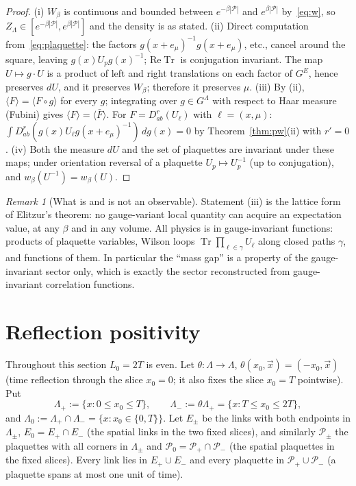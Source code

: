 \documentclass[11pt,a4paper]{article}
\theoremstyle{definition}
\theoremstyle{remark}
\newtheorem{remark}[theorem]{Remark}
\DeclareMathOperator{\Tr}{Tr}
\newcommand{\cP}{\mathcal{P}}
\begin{document}
\begin{proof}
(i) $W_\beta$ is continuous and bounded between $e^{-\beta|\cP|}$ and $e^{\beta|\cP|}$ by~\eqref{eq:w}, so
$Z_\Lambda\in[e^{-\beta|\cP|},e^{\beta|\cP|}]$ and the density is as stated.
(ii) Direct computation from~\eqref{eq:plaquette}: the factors $g(x+e_\mu)^{-1}g(x+e_\mu)$, etc., cancel
around the square, leaving $g(x)U_pg(x)^{-1}$; $\mathrm{Re}\Tr$ is conjugation invariant. The map $U\mapsto g\cdot U$
is a product of left and right translations on each factor of $G^{E}$, hence preserves $dU$, and it preserves
$W_\beta$; therefore it preserves $\mu$.
(iii) By (ii), $\langle F\rangle=\langle F\circ g\rangle$ for every $g$; integrating over $g\in G^\Lambda$ with
respect to Haar measure (Fubini) gives $\langle F\rangle=\langle\bar F\rangle$. For $F=D^r_{ab}(U_\ell)$ with
$\ell=(x,\mu)$: $\int D^r_{ab}(g(x)U_\ell g(x+e_\mu)^{-1})\,dg(x)=0$ by Theorem~\ref{thm:pw}(ii) with $r'=0$.
(iv) Both the measure $dU$ and the set of plaquettes are invariant under these maps; under orientation
reversal of a plaquette $U_p\mapsto U_p^{-1}$ (up to conjugation), and $w_\beta(U^{-1})=w_\beta(U)$.
\end{proof}

\begin{remark}[What is and is not an observable]
Statement (iii) is the lattice form of Elitzur's theorem: no gauge-variant local quantity can acquire an
expectation value, at any $\beta$ and in any volume. All physics is in gauge-invariant functions: products
of plaquette variables, Wilson loops $\Tr\prod_{\ell\in\gamma}U_\ell$ along closed paths $\gamma$, and
functions of them. In particular the ``mass gap'' is a property of the gauge-invariant sector only, which is
exactly the sector reconstructed from gauge-invariant correlation functions.
\end{remark}

\section{Reflection positivity}\label{sec:rp}

Throughout this section $L_0=2T$ is even. Let $\theta:\Lambda\to\Lambda$, $\theta(x_0,\vec x)=(-x_0,\vec x)$
(time reflection through the slice $x_0=0$; it also fixes the slice $x_0=T$ pointwise). Put
\[
\Lambda_+:=\{x:0\le x_0\le T\},\qquad \Lambda_-:=\theta\Lambda_+=\{x:T\le x_0\le 2T\},
\]
and $\Lambda_0:=\Lambda_+\cap\Lambda_-=\{x:x_0\in\{0,T\}\}$.
Let $E_\pm$ be the links with both endpoints in $\Lambda_\pm$, $E_0=E_+\cap E_-$ (the spatial links in the two
fixed slices), and similarly $\cP_\pm$ the plaquettes with all corners in $\Lambda_\pm$ and $\cP_0=\cP_+\cap\cP_-$
(the spatial plaquettes in the fixed slices). Every link lies in $E_+\cup E_-$ and every plaquette in
$\cP_+\cup\cP_-$ (a plaquette spans at most one unit of time).
\end{document}
